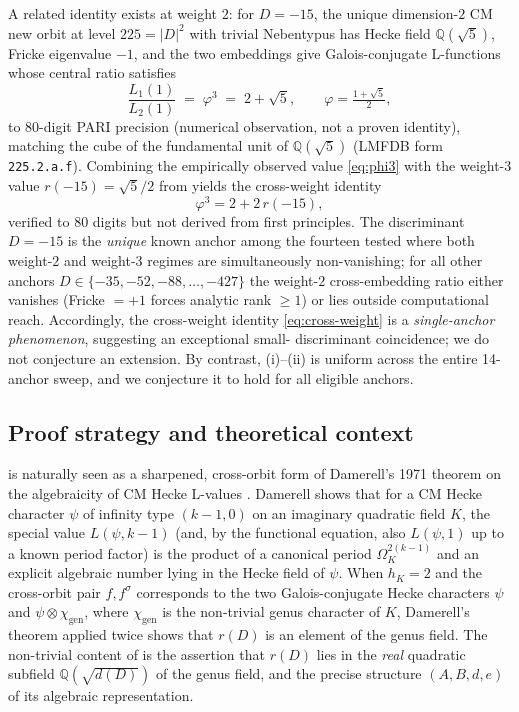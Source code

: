 \documentclass[11pt]{amsart}
\theoremstyle{definition}
\theoremstyle{remark}
\newcommand{\Q}{\mathbb{Q}}
\begin{document}
A related identity exists at weight \(2\): for \(D = -15\), the unique
dimension-\(2\) CM new orbit at level \(225 = |D|^{2}\) with trivial
Nebentypus has Hecke field \(\Q(\sqrt{5})\), Fricke eigenvalue \(-1\),
and the two embeddings give Galois-conjugate L-functions whose central
ratio satisfies
\begin{equation}\label{eq:phi3}
   \frac{L_{1}(1)}{L_{2}(1)}
   \;=\; \varphi^{3} \;=\; 2 + \sqrt{5} ,
   \qquad \varphi = \tfrac{1 + \sqrt{5}}{2} ,
\end{equation}
to \(80\)-digit PARI precision (numerical observation, not a proven
identity), matching the cube of the fundamental unit of
\(\Q(\sqrt{5})\) (LMFDB form \texttt{225.2.a.f}). Combining the
empirically observed value \eqref{eq:phi3} with the weight-\(3\)
value \(r(-15) = \sqrt{5}/2\) from  yields the
cross-weight identity
\begin{equation}\label{eq:cross-weight}
   \varphi^{3} = 2 + 2\, r(-15) ,
\end{equation}
verified to \(80\) digits but not derived from first principles. The discriminant \(D = -15\) is the
\emph{unique} known anchor among the fourteen tested where both
weight-\(2\) and weight-\(3\) regimes are simultaneously non-vanishing;
for all other anchors \(D \in \{-35, -52, -88, \dots, -427\}\) the
weight-\(2\) cross-embedding ratio either vanishes (Fricke \(= +1\)
forces analytic rank \(\ge 1\)) or lies outside computational reach.
Accordingly, the cross-weight identity \eqref{eq:cross-weight} is a
\emph{single-anchor phenomenon}, suggesting an exceptional small-
discriminant coincidence; we do not conjecture an extension. By
contrast, (i)--(ii) is uniform across the entire
14-anchor sweep, and we conjecture it to hold for all eligible
anchors.

\subsection{Proof strategy and theoretical context}\label{ssec:strategy}

 is naturally seen as a sharpened, cross-orbit form
of Damerell's 1971 theorem on the algebraicity of CM Hecke
L-values \cite{Damerell1971,Shimura1976}. Damerell shows that for a
CM Hecke character \(\psi\) of infinity type \((k - 1, 0)\) on an
imaginary quadratic field \(K\), the special value
\(L(\psi, k - 1)\) (and, by the functional equation, also
\(L(\psi, 1)\) up to a known period factor) is the product of a
canonical period \(\Omega_{K}^{2(k-1)}\) and an explicit algebraic
number lying in the Hecke field of \(\psi\). When \(h_{K} = 2\) and
the cross-orbit pair \(f, f^{\sigma}\) corresponds to the two
Galois-conjugate Hecke characters \(\psi\) and \(\psi \otimes
\chi_{\mathrm{gen}}\), where \(\chi_{\mathrm{gen}}\) is the
non-trivial genus character of \(K\), Damerell's theorem applied
twice shows that \(r(D)\) is an element of the genus field. The
non-trivial content of  is the assertion that
\(r(D)\) lies in the \emph{real} quadratic subfield
\(\Q(\sqrt{d(D)})\) of the genus field, and the precise structure
\((A, B, d, e)\) of its algebraic representation.
\end{document}
